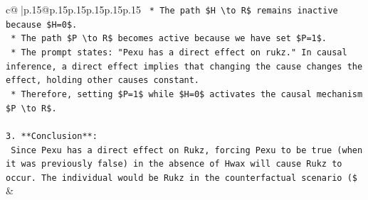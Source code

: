 \documentclass{article}
\begin{document}
{\begin{supertabular}{c@{$\;$}|p{.15\linewidth}@{}p{.15\linewidth}p{.15\linewidth}p{.15\linewidth}p{.15\linewidth}p{.15\linewidth}}
{{{\texttt{        *   The path \$H \textbackslash{}to R\$ remains inactive because \$H=0\$.} \\
\texttt{        *   The path \$P \textbackslash{}to R\$ becomes active because we have set \$P=1\$.} \\
\texttt{        *   The prompt states: "Pexu has a direct effect on rukz." In causal inference, a direct effect implies that changing the cause changes the effect, holding other causes constant.} \\
\texttt{        *   Therefore, setting \$P=1\$ while \$H=0\$ activates the causal mechanism \$P \textbackslash{}to R\$.} \\
\\ 
\texttt{3.  **Conclusion**:} \\
\texttt{    Since Pexu has a direct effect on Rukz, forcing Pexu to be true (when it was previously false) in the absence of Hwax will cause Rukz to occur. The individual would be Rukz in the counterfactual scenario (\$} \\
            }
        }
    }
    & \\ \\


\end{supertabular}}
\end{document}
